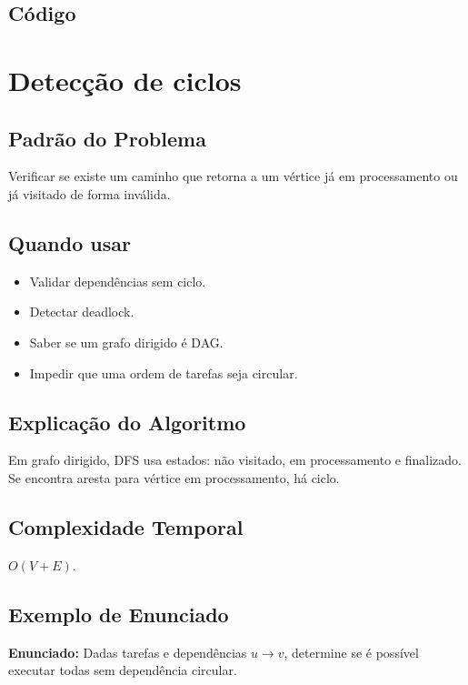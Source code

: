 \subsection{Código}

\section{Detecção de ciclos}

\subsection{Padrão do Problema}
Verificar se existe um caminho que retorna a um vértice já em processamento ou já visitado de forma inválida.

\subsection{Quando usar}
\begin{itemize}[nosep]
  \item Validar dependências sem ciclo.
  \item Detectar deadlock.
  \item Saber se um grafo dirigido é DAG.
  \item Impedir que uma ordem de tarefas seja circular.
\end{itemize}

\subsection{Explicação do Algoritmo}
Em grafo dirigido, DFS usa estados: não visitado, em processamento e finalizado. Se encontra aresta para vértice em processamento, há ciclo.

\subsection{Complexidade Temporal}
$O(V + E)$.

\subsection{Exemplo de Enunciado}
\begin{exemplodiabox}
\textbf{Enunciado:} Dadas tarefas e dependências $u \to v$, determine se é possível executar todas sem dependência circular.
\end{exemplodiabox}

